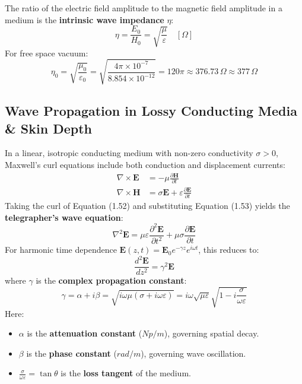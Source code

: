 \begin{definition}
The ratio of the electric field amplitude to the magnetic field amplitude in a medium is the \textbf{intrinsic wave impedance} $\eta$:
\begin{equation}
    \eta = \frac{E_0}{H_0} = \sqrt{\frac{\mu}{\varepsilon}} \quad [\si{\Omega}]
\end{equation}
For free space vacuum:
\begin{equation}
    \eta_0 = \sqrt{\frac{\mu_0}{\varepsilon_0}} = \sqrt{\frac{4\pi \times 10^{-7}}{8.854 \times 10^{-12}}} = 120\pi \approx 376.73\,\Omega \approx 377\,\Omega
\end{equation}
\end{definition}

\subsection{Wave Propagation in Lossy Conducting Media \& Skin Depth}
In a linear, isotropic conducting medium with non-zero conductivity $\sigma > 0$, Maxwell's curl equations include both conduction and displacement currents:
\begin{align}
    \nabla \times \mathbf{E} &= -\mu \frac{\partial \mathbf{H}}{\partial t} \\
    \nabla \times \mathbf{H} &= \sigma \mathbf{E} + \varepsilon \frac{\partial \mathbf{E}}{\partial t}
\end{align}
Taking the curl of Equation (1.52) and substituting Equation (1.53) yields the \textbf{telegrapher's wave equation}:
\begin{equation}
    \nabla^2 \mathbf{E} = \mu \varepsilon \frac{\partial^2 \mathbf{E}}{\partial t^2} + \mu \sigma \frac{\partial \mathbf{E}}{\partial t}
\end{equation}
For harmonic time dependence $\mathbf{E}(z,t) = \mathbf{E}_0 e^{-\gamma z} e^{i\omega t}$, this reduces to:
\begin{equation}
    \frac{d^2 \mathbf{E}}{dz^2} = \gamma^2 \mathbf{E}
\end{equation}
where $\gamma$ is the \textbf{complex propagation constant}:
\begin{equation}
    \gamma = \alpha + i\beta = \sqrt{i\omega\mu(\sigma + i\omega\varepsilon)} = i\omega\sqrt{\mu\varepsilon}\sqrt{1 - i\frac{\sigma}{\omega\varepsilon}}
\end{equation}
Here:
\begin{itemize}
    \item $\alpha$ is the \textbf{attenuation constant} ($\si{Np/m}$), governing spatial decay.
    \item $\beta$ is the \textbf{phase constant} ($\si{rad/m}$), governing wave oscillation.
    \item $\frac{\sigma}{\omega\varepsilon} = \tan\theta$ is the \textbf{loss tangent} of the medium.
\end{itemize}

